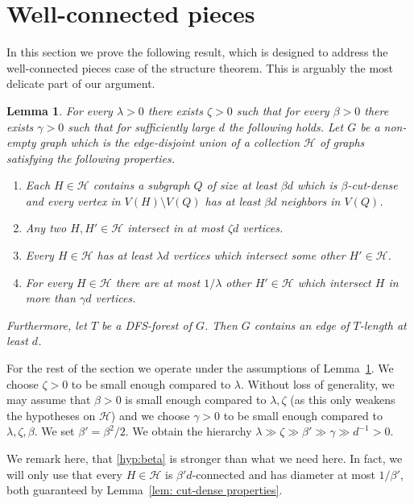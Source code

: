 \documentclass[10pt]{article}
\newtheorem{lemma}[theorem]{Lemma}
\theoremstyle{definition}
\begin{document}
\section{Well-connected pieces}\label{sec: well connected pieces}
In this section we prove the following result, which is designed to address the well-connected pieces case of the structure theorem. This is arguably the most delicate part of our argument.
\begin{lemma}\label{lem:main cut-dense union}
    For every $\lambda>0$ there exists $\zeta>0$ such that for every $\beta>0$ there exists $\gamma>0$ such that for sufficiently large $d$ the following holds.
    Let $G$ be a non-empty graph which is the edge-disjoint union of a collection $\mathcal H$ of graphs satisfying the following properties.
    \begin{enumerate}[ref=(\arabic*)]
        \item Each $H\in\mathcal H$ contains a subgraph $Q$ of size at least $\beta d$ which is $\beta$-cut-dense and every vertex in $V(H)\setminus V(Q)$ has at least $\beta d$ neighbors in $V(Q)$.\label{hyp:beta}
        \item Any two $H,H'\in\mathcal H$ intersect in at most $\zeta d$ vertices.\label{hyp:zeta}
        \item Every $H\in \mathcal H$ has at least $\lambda d$ vertices which intersect some other $H'\in\mathcal H$.\label{hyp:lambda}
        \item For every $H\in\mathcal H$ there are at most $1/\lambda$ other $H'\in\mathcal H$ which intersect $H$ in more than $\gamma d$ vertices.\label{hyp:gamma}
    \end{enumerate}
    Furthermore, let $T$ be a DFS-forest of $G$. Then $G$ contains an edge of $T$-length at least $d$.
\end{lemma}
For the rest of the section we operate under the assumptions of Lemma~\ref{lem:main cut-dense union}. We choose $\zeta>0$ to be small enough compared to $\lambda$. Without loss of generality, we may assume that $\beta>0$ is small enough compared to $\lambda,\zeta$ (as this only weakens the hypotheses on $\mathcal{H}$) and we choose $\gamma>0$ to be small enough compared to $\lambda,\zeta,\beta$. We set $\beta'=\beta^2/2$. We obtain the hierarchy $\lambda\gg\zeta\gg\beta'\gg\gamma\gg d^{-1}>0$.  

We remark here, that \ref{hyp:beta} is stronger than what we need here. In fact, we will only use that every $H\in\mathcal H$ is $\beta' d$-connected and has diameter at most $1/\beta'$, both guaranteed by Lemma~\ref{lem: cut-dense properties}.
\end{document}
